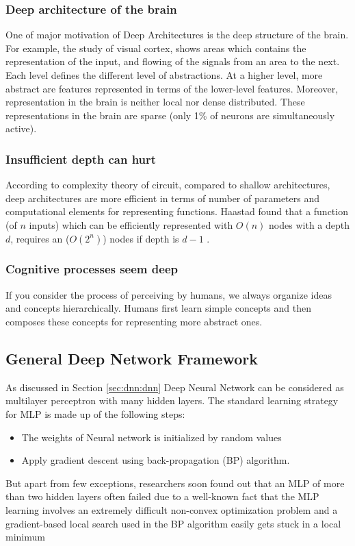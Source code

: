 \subsubsection{Deep architecture of the brain}
One of major motivation of Deep Architectures is the deep structure of the brain. For example, the study of visual cortex, shows areas which contains the representation of the input, and flowing of the signals from an area to the next. Each level defines the different level of abstractions. At a higher level, more abstract are features represented in terms of the lower-level features. Moreover, representation in the brain is neither local nor dense distributed. These representations in the brain are sparse (only 1\% of neurons are simultaneously active).

\subsubsection{Insufficient depth can hurt}
According to complexity theory of circuit, compared to shallow architectures, deep architectures are more efficient in terms of number of parameters and computational elements for representing functions\citep{bengio2007scaling}. Haastad found that a function (of $n$ inputs) which can be efficiently represented with $O(n)$ nodes with a depth $d$, requires an ($O(2^n)$) nodes if depth is $d-1$ \citep{bengio2007greedy}.

\subsubsection{Cognitive processes seem deep}
If you consider the process of perceiving by humans, we always organize ideas and concepts hierarchically. Humans first learn simple concepts and then composes these concepts for representing more abstract ones. 

\subsection{General Deep Network Framework}
As discussed in Section \ref{sec:dnn:dnn} Deep Neural Network can be considered as multilayer perceptron with many hidden layers. The standard learning strategy for MLP is made up of the following steps:
\begin{itemize}
\item The weights of Neural network is initialized by random values
\item Apply gradient descent using back-propagation (BP) algorithm.
\end{itemize}
But apart from few exceptions, researchers soon found out that an MLP of more than two hidden layers often failed \cite{bengio2007greedy} due to a well-known fact that the MLP learning involves an extremely difficult non-convex optimization problem and a gradient-based local search used in
the BP algorithm easily gets stuck in a local minimum 

